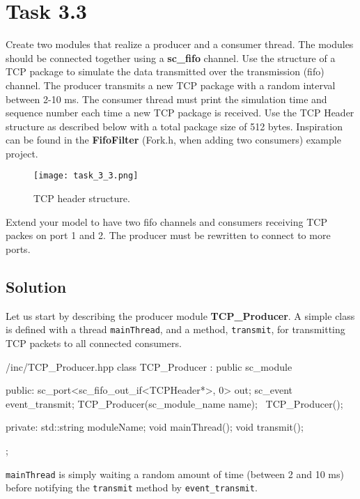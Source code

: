 \documentclass[../main.tex]{subfiles}
\begin{document}
\section{Task 3.3}

Create two modules that realize a producer and a consumer thread. The modules should be connected together using a \textbf{sc\_fifo} channel. Use the structure of a TCP package to simulate the data transmitted over the transmission (fifo) channel. The producer transmits a new TCP package with a random interval between 2-10 ms. The consumer thread must print the simulation time and sequence number each time a new TCP package is received. Use the TCP Header structure as described below with a total package size of 512 bytes. Inspiration can be found in the \textbf{FifoFilter} (Fork.h, when adding two consumers) example project.


\begin{figure}[h]
    \centering
    \texttt{[image: task\_3\_3.png]}
    \caption{TCP header structure.}
    \label{fig:tcp}
\end{figure}

Extend your model to have two fifo channels and consumers receiving TCP packes on port 1 and 2. The producer must be rewritten to connect to more ports.

\subsection*{Solution}

Let us start by describing the producer module \textbf{TCP\_Producer}. A simple class is defined with a thread \texttt{mainThread}, and a method, \texttt{transmit}, for transmitting TCP packets to all connected consumers.

\begin{myminted}{/inc/TCP\_Producer.hpp}
class TCP_Producer : public sc_module {
    public:
        sc_port<sc_fifo_out_if<TCPHeader*>, 0> out;
        sc_event event_transmit;
        TCP_Producer(sc_module_name name);
        ~TCP_Producer();
    
    private:
        std::string moduleName;
        void mainThread();
        void transmit();
    };
\end{myminted}

\texttt{mainThread} is simply waiting a random amount of time (between 2 and 10 ms) before notifying the \texttt{transmit} method by \texttt{event\_transmit}.

\newpage
\end{document}
